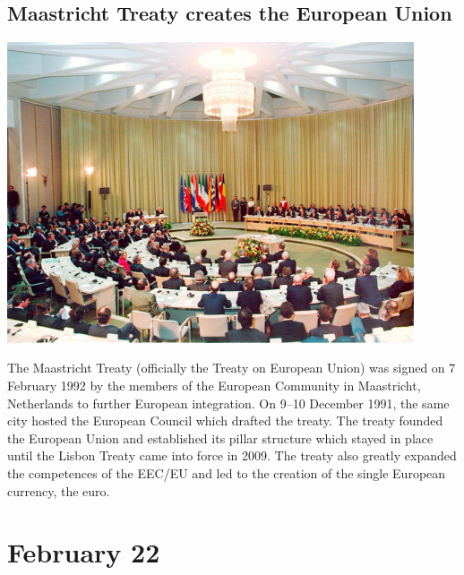 \documentclass[11pt]{report}
\begin{document}
\subsection{Maastricht Treaty creates the European Union}
\vspace{2mm}\begin{center}\includegraphics[width=12cm]{./img/maastrichtTreaty.jpg}\end{center}
The Maastricht Treaty (officially the Treaty on European Union) was signed on 7 February 1992 by the members of the European Community in Maastricht, Netherlands to further European integration. On 9–10 December 1991, the same city hosted the European Council which drafted the treaty. The treaty founded the European Union and established its pillar structure which stayed in place until the Lisbon Treaty came into force in 2009. The treaty also greatly expanded the competences of the EEC/EU and led to the creation of the single European currency, the euro.

\section{February 22}
\end{document}
